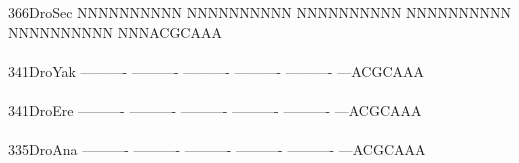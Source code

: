 \documentclass[11pt,twoside,reqno,a4paper]{article}
\begin{document}
{366\hspace*{1\charwidth}DroSec	NNNNNNNNNN	NNNNNNNNNN	NNNNNNNNNN	NNNNNNNNNN	NNNNNNNNNN	NNNACGCAAA	\\
\hspace*{4\charwidth}\hspace*{7\charwidth}\hspace*{1\charwidth}\hspace*{1\charwidth}\hspace*{1\charwidth}\hspace*{1\charwidth}\hspace*{1\charwidth}\hspace*{1\charwidth}\\
341\hspace*{1\charwidth}DroYak	----------	----------	----------	----------	----------	---ACGCAAA	\\
\hspace*{4\charwidth}\hspace*{7\charwidth}\hspace*{1\charwidth}\hspace*{1\charwidth}\hspace*{1\charwidth}\hspace*{1\charwidth}\hspace*{1\charwidth}\hspace*{1\charwidth}\\
341\hspace*{1\charwidth}DroEre	----------	----------	----------	----------	----------	---ACGCAAA	\\
\hspace*{4\charwidth}\hspace*{7\charwidth}\hspace*{1\charwidth}\hspace*{1\charwidth}\hspace*{1\charwidth}\hspace*{1\charwidth}\hspace*{1\charwidth}\hspace*{1\charwidth}\\
335\hspace*{1\charwidth}DroAna	----------	----------	----------	----------	----------	---ACGCAAA	\\
\hspace*{4\charwidth}\hspace*{7\charwidth}\hspace*{1\charwidth}\hspace*{1\charwidth}\hspace*{1\charwidth}\hspace*{1\charwidth}\hspace*{1\charwidth}\hspace*{1\charwidth}\\
}
\end{document}
